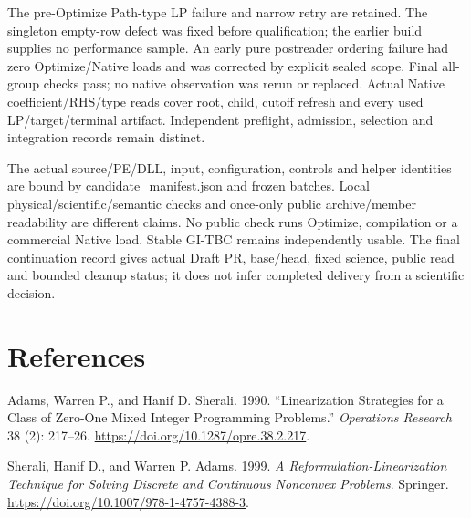 \documentclass[
  american,
  11pt,
]{article}
\newlength{\cslhangindent}
\newenvironment{CSLReferences}[2] %
 {\begin{list}{}{%
  \setlength{\itemindent}{0pt}
  \setlength{\leftmargin}{0pt}
  \setlength{\parsep}{0pt}
  \ifodd #1
   \setlength{\leftmargin}{\cslhangindent}
   \setlength{\itemindent}{-1\cslhangindent}
  \fi
  \setlength{\itemsep}{#2\baselineskip}}}
 {\end{list}}
\begin{document}
The pre-Optimize Path-type LP failure and narrow retry are retained. The
singleton empty-row defect was fixed before qualification; the earlier
build supplies no performance sample. An early pure postreader ordering
failure had zero Optimize/Native loads and was corrected by explicit
sealed scope. Final all-group checks pass; no native observation was
rerun or replaced. Actual Native coefficient/RHS/type reads cover root,
child, cutoff refresh and every used LP/target/terminal artifact.
Independent preflight, admission, selection and integration records
remain distinct.

The actual source/PE/DLL, input, configuration, controls and helper
identities are bound by candidate\_\allowbreak{}manifest.json and frozen batches.
Local physical/scientific/semantic checks and once-only public
archive/member readability are different claims. No public check runs
Optimize, compilation or a commercial Native load. Stable GI-TBC remains
independently usable. The final continuation record gives actual Draft
PR, base/head, fixed science, public read and bounded cleanup status; it
does not infer completed delivery from a scientific decision.

\section{References}\label{references}

\protect{}\label{refs}
\begin{CSLReferences}{1}{1}
Adams, Warren P., and Hanif D. Sherali. 1990. {``Linearization
Strategies for a Class of Zero-One Mixed Integer Programming
Problems.''} \emph{Operations Research} 38 (2): 217--26.
\url{https://doi.org/10.1287/opre.38.2.217}.

Sherali, Hanif D., and Warren P. Adams. 1999. \emph{A
Reformulation-Linearization Technique for Solving Discrete and
Continuous Nonconvex Problems}. Springer.
\url{https://doi.org/10.1007/978-1-4757-4388-3}.

\end{CSLReferences}
\end{document}
